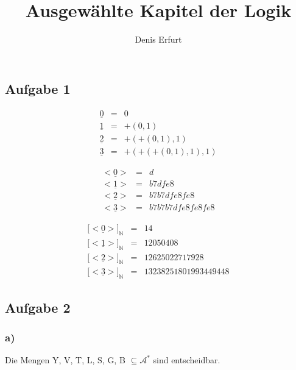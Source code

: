 \documentclass[12pt]{article}
\begin{document}
\title{Ausgewählte Kapitel der Logik}
\author{Denis Erfurt}
\maketitle



\subsection*{Aufgabe 1}
\begin{eqnarray}
  \underline{0}&=&0 \\
  \underline{1}&=&+(0,1)\\
  \underline{2}&=&+(+(0,1),1)\\
  \underline{3}&=&+(+(+(0,1),1),1)
\end{eqnarray}

\begin{eqnarray}
  <\underline{0}>&=&d \\
  <\underline{1}>&=&b7dfe8 \\
  <\underline{2}>&=&b7b7dfe8fe8 \\
  <\underline{3}>&=&b7b7b7dfe8fe8fe8
\end{eqnarray}

\begin{eqnarray}
  \lbrack<\underline{0}>\rbrack_{\mathbb{N}}&=&14 \\
  \lbrack<\underline{1}>\rbrack_{\mathbb{N}}&=&12050408\\
  \lbrack<\underline{2}>\rbrack_\mathbb{N}&=&12625022717928\\
  \lbrack<\underline{3}>\rbrack_\mathbb{N}&=&13238251801993449448
\end{eqnarray}

\subsection*{Aufgabe 2}

\subsubsection*{a)}
Die Mengen Y, V, T, L, S, G, B $\subseteq \mathcal{A}^*$ sind entscheidbar.
\end{document}
